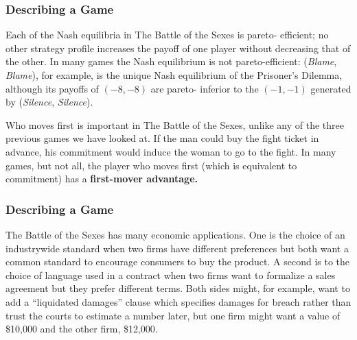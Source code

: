  \begin{frame}[fragile]\frametitle{Describing a Game}
       Each of the Nash equilibria in The {Battle  of the Sexes} is pareto-
efficient;   no other strategy profile increases the payoff of one player
without decreasing that of the other. In many games the Nash equilibrium is not
pareto-efficient: ({\it Blame}, {\it Blame}), for example, is the unique Nash
equilibrium of   the Prisoner's Dilemma, although its payoffs of $(-8,-8)$ are
pareto- inferior to the $(-1,-1)$ generated by ({\it Silence}, {\it Silence}).

     Who moves first is important in The {Battle  of the Sexes}, unlike any of
the three previous games we have looked at. If the man could buy the fight
ticket in advance, his commitment would induce the woman to go to the fight. In
many games, but not all, the player who moves first (which is equivalent to
commitment) has a {\bf first-mover advantage.}

\end{frame}
 \begin{frame}[fragile]\frametitle{Describing a Game}
   The {Battle of the Sexes}  has many economic applications. One is the choice
of an industrywide standard when two firms have different preferences but both
want a common standard to encourage consumers to buy the product. A second is to
the choice of language used in a contract when two firms want to formalize a
sales agreement but they prefer different terms. Both sides might, for example,
want to add a ``liquidated damages'' clause which specifies damages for breach
rather than trust  the courts to estimate a number later, but one firm might
want a value of \$10,000 and the other firm, \$12,000.

\end{frame}
